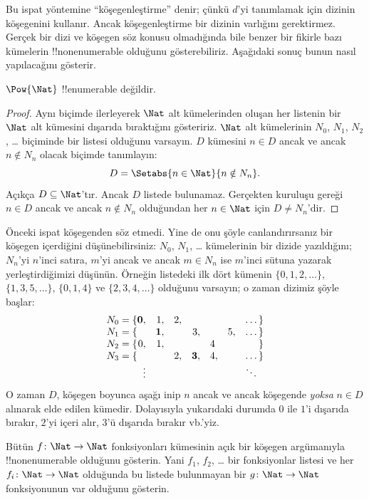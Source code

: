 \documentclass[../../../include/open-logic-section]{subfiles}
\begin{document}
\begin{explain}
Bu ispat yöntemine ``köşegenleştirme'' denir; çünkü $d$'yi tanımlamak için
dizinin köşegenini kullanır. Ancak köşegenleştirme bir dizinin varlığını
gerektirmez. Gerçek bir dizi ve köşegen söz konusu olmadığında bile benzer bir
fikirle bazı kümelerin !!{nonenumerable} olduğunu gösterebiliriz. Aşağıdaki
sonuç bunun nasıl yapılacağını gösterir.
\end{explain}

\begin{thm}
$\Pow{\Nat}$ !!{enumerable} değildir.
\end{thm}

\begin{proof}
Aynı biçimde ilerleyerek $\Nat$ alt kümelerinden oluşan her listenin bir
$\Nat$ alt kümesini dışarıda bıraktığını gösteririz. $\Nat$ alt kümelerinin
$N_0$, $N_1$, $N_2$, \ldots{} biçiminde bir listesi olduğunu varsayın. $D$
kümesini $n\in D$ ancak ve ancak $n\notin N_n$ olacak biçimde tanımlayın:
\[
D = \Setabs{n \in \Nat}{n \notin N_n}.
\]
Açıkça $D\subseteq\Nat$'tır. Ancak $D$ listede bulunamaz. Gerçekten kuruluşu
gereği $n\in D$ ancak ve ancak $n\notin N_n$ olduğundan her $n\in\Nat$ için
$D\neq N_n$'dir.
\end{proof}

\begin{explain}
Önceki ispat köşegenden söz etmedi. Yine de onu şöyle canlandırırsanız bir
köşegen içerdiğini düşünebilirsiniz: $N_0$, $N_1$, \dots{} kümelerinin bir
dizide yazıldığını; $N_n$'yi $n$'inci satıra, $m$'yi ancak ve ancak $m\in N_n$
ise $m$'inci sütuna yazarak yerleştirdiğimizi düşünün. Örneğin listedeki
ilk dört kümenin $\{0,1,2,\dots\}$, $\{1,3,5,\dots\}$, $\{0,1,4\}$ ve
$\{2,3,4,\dots\}$ olduğunu varsayın; o zaman dizimiz şöyle başlar:
\[
\begin{array}{r@{}rrrrrrr}
  N_0 = \{ & \mathbf{0}, & 1, & 2, & & & & \dots\}\\
  N_1 = \{ &  & \mathbf{1}, &  & 3, &  & 5, & \dots\}\\
  N_2 = \{ & 0, & 1, &  &  & 4\phantom{,} &  & \}\\
  N_3 = \{ &  &  & 2, & \mathbf{3}, & 4, & & \dots\}\\
  &\vdots & & & & & & \ddots\phantom{\}}
  \end{array}
\]
O zaman $D$, köşegen boyunca aşağı inip $n$ ancak ve ancak köşegende
\emph{yoksa} $n\in D$ alınarak elde edilen kümedir. Dolayısıyla yukarıdaki
durumda $0$ ile $1$'i dışarıda bırakır, $2$'yi içeri alır, $3$'ü dışarıda
bırakır vb.'yiz.
\end{explain}

\begin{prob}
Bütün $f\colon\Nat\to\Nat$ fonksiyonları kümesinin açık bir köşegen
argümanıyla !!{nonenumerable} olduğunu gösterin. Yani $f_1$, $f_2$, \dots{}
bir fonksiyonlar listesi ve her $f_i\colon\Nat\to\Nat$ olduğunda bu listede
bulunmayan bir $g\colon\Nat\to\Nat$ fonksiyonunun var olduğunu gösterin.
\end{prob}
\end{document}
